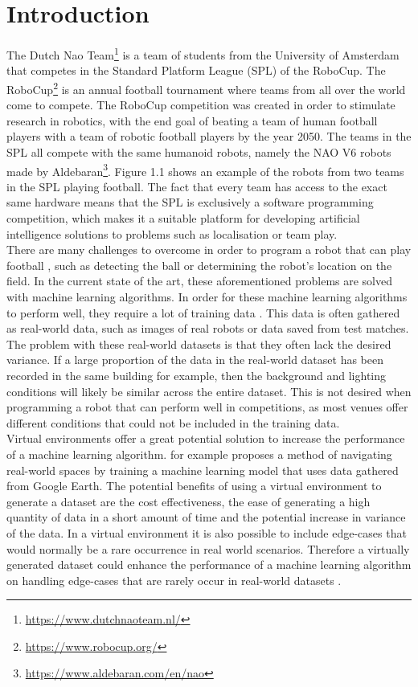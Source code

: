 \documentclass{uva-inf-bachelor-thesis}
\begin{document}
\chapter{Introduction}
    The Dutch Nao Team\footnote{\url{https://www.dutchnaoteam.nl/}} is a team of students from the University of Amsterdam that competes in the Standard Platform League (SPL) of the RoboCup. The RoboCup\footnote{\url{https://www.robocup.org/}} is an annual football tournament where teams from all over the world come to compete. The RoboCup competition was created in order to stimulate research in robotics, with the end goal of beating a team of human football players with a team of robotic football players by the year 2050. The teams in the SPL all compete with the same humanoid robots, namely the NAO V6 robots made by Aldebaran\footnote{\url{https://www.aldebaran.com/en/nao}}. Figure 1.1 shows an example of the robots from two teams in the SPL playing football. The fact that every team has access to the exact same hardware means that the SPL is exclusively a software programming competition, which makes it a suitable platform for developing artificial intelligence solutions to problems such as localisation or team play.
    \hfill \break \\
    There are many challenges to overcome in order to program a robot that can play football \cite{challenges}, such as detecting the ball or determining the robot's location on the field. In the current state of the art, these aforementioned problems are solved with machine learning algorithms. In order for these machine learning algorithms to perform well, they require a lot of training data \cite{KornblithShlensLe2019}. This data is often gathered as real-world data, such as images of real robots or data saved from test matches. The problem with these real-world datasets is that they often lack the desired variance. If a large proportion of the data in the real-world dataset has been recorded in the same building for example, then the background and lighting conditions will likely be similar across the entire dataset. This is not desired when programming a robot that can perform well in competitions, as most venues offer different conditions that could not be included in the training data.
    \hfill \break \\
    Virtual environments offer a great potential solution to increase the performance of a machine learning algorithm. \cite{virt} for example proposes a method of navigating real-world spaces by training a machine learning model that uses data gathered from Google Earth. The potential benefits of using a virtual environment to generate a dataset are the cost effectiveness, the ease of generating a high quantity of data in a short amount of time and the potential increase in variance of the data. In a virtual environment it is also possible to include edge-cases that would normally be a rare occurrence in real world scenarios. Therefore a virtually generated dataset could enhance the performance of a machine learning algorithm on handling edge-cases that are rarely occur in real-world datasets \cite{edge}.   
\end{document}
